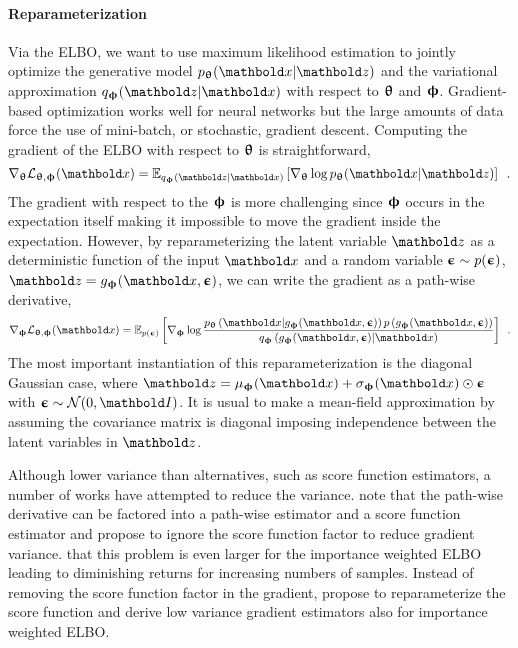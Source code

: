 \paragraph{Reparameterization} 
Via the ELBO, we want to use maximum likelihood estimation to jointly optimize the generative model $p_\thetab(\xb|\zb)$ and the variational approximation $q_\phib(\zb|\xb)$ with respect to ${\boldsymbol{\uptheta}}$ and ${\boldsymbol{\upphi}}$. 
Gradient-based optimization works well for neural networks but the large amounts of data force the use of mini-batch, or stochastic, gradient descent. 
Computing the gradient of the ELBO with respect to ${\boldsymbol{\uptheta}}$ is straightforward,
%
\begin{equation}
    \nabla_\thetab \mathcal{L}_{\thetab,\phib}(\xb)
    = \mathbb{E}_{q_\phib(\zb|\xb)} \left[ \nabla_\thetab \log p_\thetab(\xb|\zb) \right] \enspace .
\end{equation}
%
The gradient with respect to the ${\boldsymbol{\upphi}}$ is more challenging since ${\boldsymbol{\upphi}}$ occurs in the expectation itself making it impossible to move the gradient inside the expectation. 
However, by reparameterizing the latent variable $\zb$ as a deterministic function of the input $\xb$ and a random variable ${\boldsymbol{\upepsilon}}\sim p({\boldsymbol{\upepsilon}})$, $\zb = g_\phib(\xb,\epsilonb)$, we can write the gradient as a path-wise derivative,
%
\begin{equation}
    \nabla_\phib \mathcal{L}_{\thetab,\phib}(\xb)
    = \mathbb{E}_{p(\epsilonb)} \left[ \nabla_\phib \log \frac{p_\thetab\left(\xb|g_\phib(\xb,\epsilonb)\right)p\left(g_\phib(\xb,\epsilonb)\right)}{q_\phib\left(g_\phib(\xb,\epsilonb)|\xb\right)} \right] \enspace . \\
\end{equation}
%
The most important instantiation of this reparameterization is the diagonal Gaussian case, where $\zb = \mu_\phib(\xb) + \sigma_\phib(\xb) \odot \epsilonb$ with $\epsilonb\sim\mathcal{N}(0,\mathbf{I})$. It is usual to make a mean-field approximation by assuming the covariance matrix is diagonal imposing independence between the latent variables in $\zb$. 

Although lower variance than alternatives, such as score function estimators, a number of works have attempted to reduce the variance. 
\textcite{roeder_sticking_2017} note that the path-wise derivative can be factored into a path-wise estimator and a score function estimator and propose to ignore the score function factor to reduce gradient variance. 
\textcite{rainforth_tighter_2019} that this problem is even larger for the importance weighted ELBO \parencite{burda_importance_2016} leading to diminishing returns for increasing numbers of samples. Instead of removing the score function factor in the gradient, \textcite{tucker_doubly_2019} propose to reparameterize the score function and derive low variance gradient estimators also for importance weighted ELBO.


